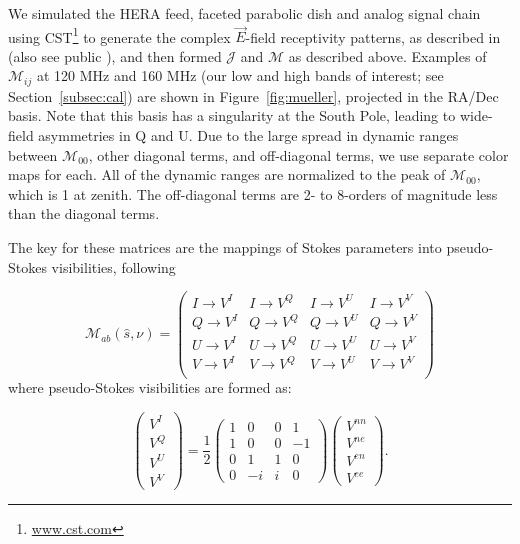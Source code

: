 \documentclass[twocolumn, trackchanges]{aastex61}
\begin{document}
We simulated the HERA feed, faceted parabolic dish and analog signal chain using CST\footnote{\url{www.cst.com}} to generate the complex $\vec{E}$-field receptivity patterns, as described in \cite{Fagnoni.16} (also see public \href{http://reionization.org/wp-content/uploads/2013/03/HERA_memo_21_CST_simulation_of_HERA_and_comparison_with_measurements.pdf}{}), and then formed $\mathcal{J}$ and $\mathcal{M}$ as described above. Examples of $\mathcal{M}_{ij}$ at 120 MHz and 160 MHz (our low and high bands of interest; see Section~\ref{subsec:cal}) are shown in Figure~\ref{fig:mueller}, projected in the RA/Dec basis. Note that this basis has a singularity at the South Pole, leading to wide-field asymmetries in Q and U. Due to the large spread in dynamic ranges between $\mathcal{M}_{00}$, other diagonal terms, and off-diagonal terms, we use separate color maps for each. All of the dynamic ranges are normalized to the peak of $\mathcal{M}_{00}$, which  is 1 at zenith. The off-diagonal terms are 2- to 8-orders of magnitude less than the diagonal terms.

The key for these matrices are the mappings of Stokes parameters into pseudo-Stokes visibilities, following

\begin{equation}
\mathcal{M}_{ab}(\hat{s},\nu) =
\begin{pmatrix}
I \rightarrow V^I & I \rightarrow V^Q & I \rightarrow V^U & I \rightarrow V^V\\
Q \rightarrow V^I  & Q \rightarrow V^Q & Q \rightarrow V^U & Q \rightarrow V^V\\
U \rightarrow V^I  & U \rightarrow V^Q & U \rightarrow V^U & U \rightarrow V^V\\
V \rightarrow V^I  & V \rightarrow V^Q & V \rightarrow V^U & V \rightarrow V^V\\
\end{pmatrix}
\label{eq:Mab}
\end{equation}
where pseudo-Stokes visibilities are formed as:

\begin{equation}
\left(\begin{array}{c}
V^{I}\\
V^{Q}\\
V^{U}\\
V^{V}\end{array} \right)
= \frac{1}{2}
\left( \begin{array}{cccc}
1 & 0 & 0 & 1 \\
1 & 0 & 0 & -1 \\
0 & 1 & 1 & 0 \\
0 & -i & i & 0 \end{array} \right) 
\left(\begin{array}{c}
V^{nn}\\
V^{ne}\\
V^{en}\\
V^{ee}\end{array} \right) .
\label{eq:pseudo-stokes}
\end{equation}
\end{document}
